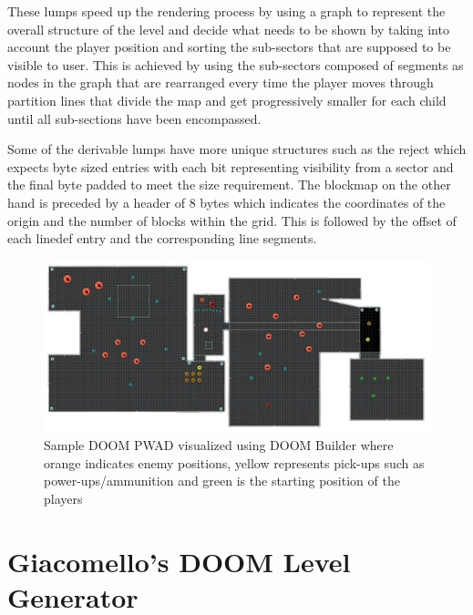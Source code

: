 \documentclass{Configuration_Files/PoliMi3i_thesis}
\begin{document}
These lumps speed up the rendering process by using a graph to represent the 
overall structure of the level and decide what needs to be shown by taking into 
account the player position and sorting the sub-sectors that are supposed to be 
visible to user. This is achieved by using the sub-sectors composed of segments as 
nodes in the graph that are rearranged every time the player moves through 
partition lines that divide the map and get progressively smaller for each child until 
all sub-sections have been encompassed.

Some of the derivable lumps have more unique structures such as the reject which 
expects byte sized entries with each bit representing visibility from a sector and the 
final byte padded to meet the size requirement. The blockmap on the other hand is 
preceded by a header of 8 bytes which indicates the coordinates of the origin and the 
number of blocks within the grid. This is followed by the offset of each linedef entry 
and the corresponding line segments.
\begin{figure}[H]
    \centering
    \includegraphics[width=1\textwidth]{sample_doom_builder.jpg}
    \caption[Sample DOOM PWAD visualized using DOOM Builder]{Sample DOOM PWAD visualized using DOOM Builder where orange 
indicates enemy positions, yellow represents pick-ups such as power-ups/ammunition and green is the starting position of the players}
    \label{fig:doombuilder}
\end{figure}
\newpage

\section{Giacomello’s DOOM Level Generator}
\end{document}
